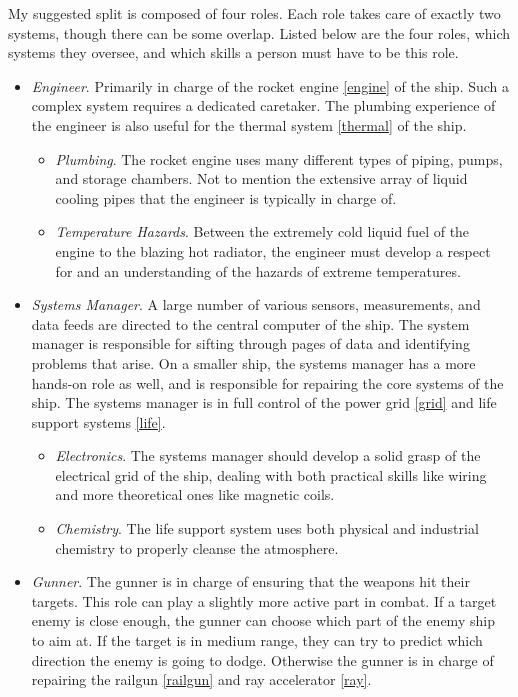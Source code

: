 \documentclass[a4paper]{article}
\begin{document}
My suggested split is composed of four roles. Each role takes care of exactly two systems, though there can be some overlap. Listed below are the four roles, which systems they oversee, and which skills a person must have to be this role.
\begin{itemize}
\item \textit{Engineer}. Primarily in charge of the rocket engine \ref{engine} of the ship. Such a complex system requires a dedicated caretaker. The plumbing experience of the engineer is also useful for the thermal system \ref{thermal} of the ship.
\begin{itemize}
\item \textit{Plumbing}. The rocket engine uses many different types of piping, pumps, and storage chambers. Not to mention the extensive array of liquid cooling pipes that the engineer is typically in charge of.
\item \textit{Temperature Hazards}. Between the extremely cold liquid fuel of the engine to the blazing hot radiator, the engineer must develop a respect for and an understanding of the hazards of extreme temperatures.
\end{itemize}
\item \textit{Systems Manager}. A large number of various sensors, measurements, and data feeds are directed to the central computer of the ship. The system manager is responsible for sifting through pages of data and identifying problems that arise. On a smaller ship, the systems manager has a more hands-on role as well, and is responsible for repairing the core systems of the ship. The systems manager is in full control of the power grid \ref{grid} and life support systems \ref{life}.
\begin{itemize}
\item \textit{Electronics}. The systems manager should develop a solid grasp of the electrical grid of the ship, dealing with both practical skills like wiring and more theoretical ones like magnetic coils.
\item \textit{Chemistry}. The life support system uses both physical and industrial chemistry to properly cleanse the atmosphere. 
\end{itemize}
\item \textit{Gunner}. The gunner is in charge of ensuring that the weapons hit their targets. This role can play a slightly more active part in combat. If a target enemy is close enough, the gunner can choose which part of the enemy ship to aim at. If the target is in medium range, they can try to predict which direction the enemy is going to dodge. Otherwise the gunner is in charge of repairing the railgun \ref{railgun} and ray accelerator \ref{ray}.

\end{itemize}
\end{document}
